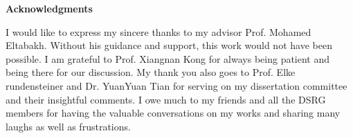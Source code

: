 \newpage
\noindent
\noindent
\begin{center}
{\large \bf Acknowledgments}
\end{center}

\noindent
\noindent

I would like to express my sincere thanks to my advisor Prof. Mohamed Eltabakh. Without his guidance and support, this work would not have been possible. I am grateful to Prof. Xiangnan Kong for always being patient and being there for our discussion. My thank you also goes to Prof. Elke rundensteiner and Dr. YuanYuan Tian for serving on my dissertation committee and their insightful comments. I owe much to my friends and all the DSRG members for having the valuable conversations on my works and sharing many laughs as well as frustrations. 

